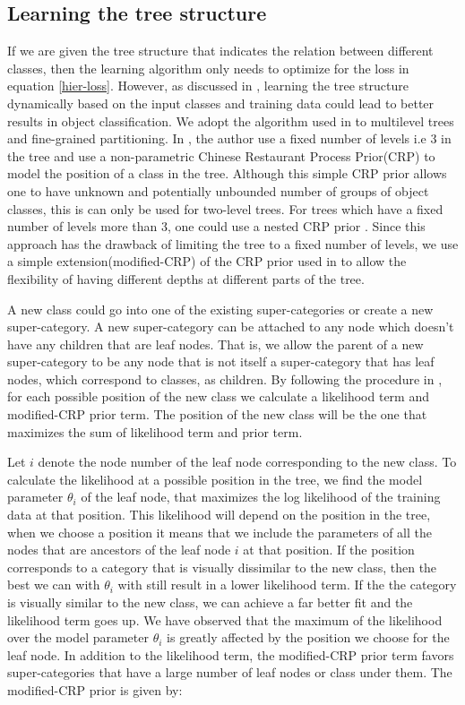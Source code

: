 \documentclass[10pt,twocolumn,letterpaper]{article}
\begin{document}
\subsection{Learning the tree structure}
If we are given the tree structure that indicates the relation between different classes, then the 
learning algorithm only needs to optimize for the loss in equation \ref{hier-loss}. However, as 
discussed in \cite{ruslan}, learning the tree structure dynamically based on the input classes and training data
could lead to better results in object classification. We adopt the algorithm used in \cite{ruslan} to multilevel trees
and fine-grained partitioning. In \cite{ruslan}, the author use a fixed number of levels i.e 3 in the tree and use
a non-parametric Chinese Restaurant Process Prior(CRP) to model the position of a class in the tree. Although this simple
CRP prior allows one to have unknown and potentially unbounded number of groups of object classes, this is can only be
used for two-level trees. For trees which have a fixed number of levels more than 3, one could use a nested CRP prior \cite{nestedCRP}.
Since this approach has the drawback of limiting the tree to a fixed number of levels, we use a simple extension(modified-CRP) of the
CRP prior used in \cite{ruslan} to allow the flexibility of  having different depths at different parts of the tree.    

A new class could go into one of the existing super-categories or create a new super-category. A new super-category 
can be attached to any node which doesn't have any children that are leaf nodes. That is, we allow the parent of a new
super-category to be any node that is not itself a super-category that has leaf nodes, which correspond to classes, as children.
By following the procedure in \cite{ruslan},  for each possible position of the new class we calculate a likelihood term and 
modified-CRP prior term. The position of the new class will be the one that maximizes the sum of likelihood term and  prior term. 

Let $i$ denote the node number of the leaf node corresponding to the new class.   
To calculate the likelihood at a possible position in the tree, we find the model parameter $\theta_{i}$ of the leaf node, 
that maximizes the log likelihood of the training data at that position. This likelihood will depend on the position in the tree, when 
we choose a position it means that we include the parameters of all the nodes that are ancestors of the leaf node $i$ at that position. 
If the position corresponds to a category that is visually dissimilar to the new class, then the best we can with $\theta_{i}$ with still 
result in a lower likelihood term. If the the category is visually similar to the new class, we can achieve a far better fit and the likelihood
term goes up. We have observed that the maximum of the likelihood over the model parameter $\theta_{i}$ is greatly affected by the position
 we choose for the leaf node. In addition to the likelihood term, the modified-CRP prior term favors super-categories that have a large number of 
 leaf nodes or class under them. The modified-CRP prior is given by:
 
\end{document}
